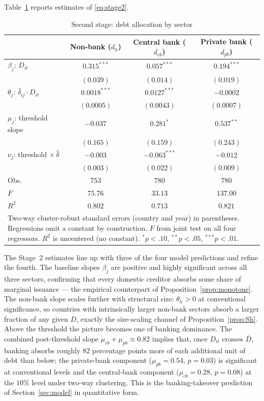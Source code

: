 \documentclass[\latexroot/\projectname]{subfiles}
\begin{document}
Table~\ref{tab:stage2} reports estimates of \eqref{eq:stage2}.

\begin{table}[htbp]\centering
\caption{Second stage: debt allocation by sector}
\label{tab:stage2}
\setlength{\tabcolsep}{8pt}
\renewcommand{\arraystretch}{1.15}
\begin{tabular}{lccc}
\toprule
 & Non-bank ($d_h$) & Central bank ($d_{cb}$) & Private bank ($d_{pb}$) \\
\midrule
$\beta_j$: $D_{it}$
  & $0.315^{***}$ & $0.057^{***}$ & $0.194^{***}$ \\
  & $(0.039)$     & $(0.014)$     & $(0.019)$ \\
$\theta_j$: $\hat{\delta}_{ij}\!\cdot D_{it}$
  & $0.0018^{***}$ & $0.0127^{***}$ & $-0.0002$ \\
  & $(0.0005)$     & $(0.0043)$     & $(0.0007)$ \\
$\mu_j$: threshold slope
  & $-0.037$  & $0.281^{*}$    & $0.537^{**}$ \\
  & $(0.165)$ & $(0.159)$      & $(0.243)$ \\
$\nu_j$: threshold $\times\,\hat{\delta}$
  & $-0.003$  & $-0.063^{***}$ & $-0.012$ \\
  & $(0.003)$ & $(0.022)$      & $(0.009)$ \\
\midrule
Obs.   & $753$    & $780$    & $780$    \\
$F$    & $75.76$  & $33.13$  & $137.00$ \\
$R^2$  & $0.802$  & $0.713$  & $0.821$  \\
\bottomrule
\multicolumn{4}{p{0.9\linewidth}}{\footnotesize Two-way cluster-robust standard errors (country and year) in parentheses. Regressions omit a constant by construction. $F$ from joint test on all four regressors. $R^2$ is uncentered (no constant). $^{*}p<.10$, $^{**}p<.05$, $^{***}p<.01$.}
\end{tabular}
\end{table}

The Stage~2 estimates line up with three of the four model
predictions and refine the fourth. The baseline slopes $\beta_j$ are
positive and highly significant across all three sectors, confirming
that every domestic creditor absorbs some share of marginal issuance
--- the empirical counterpart of Proposition~\ref{prop:monotone}.
The non-bank slope scales further with structural size: $\theta_h>0$
at conventional significance, so countries with intrinsically larger
non-bank sectors absorb a larger fraction of any given $D$, exactly
the size-scaling channel of Proposition~\ref{prop:Sh}. Above the
threshold the picture becomes one of banking dominance. The combined
post-threshold slope $\mu_{cb}+\mu_{pb}\approx 0.82$ implies that,
once $D_{it}$ crosses $\bar D$, banking absorbs roughly $82$
percentage points more of each additional unit of debt than below;
the private-bank component ($\mu_{pb}=0.54$, $p=0.03$) is significant
at conventional levels and the central-bank component ($\mu_{cb}=0.28$,
$p=0.08$) at the $10\%$ level under two-way clustering. This is the
banking-takeover prediction of Section~\ref{sec:model} in
quantitative form.
\end{document}
